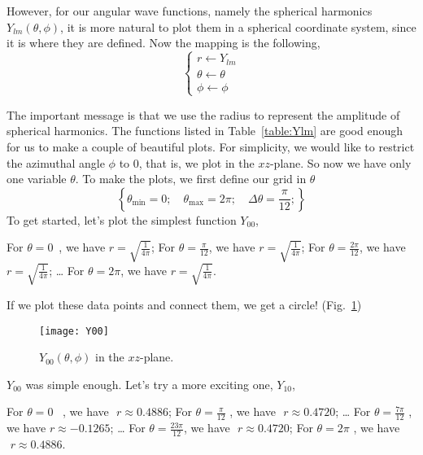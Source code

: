 However, for our angular wave functions, namely the spherical harmonics $Y_{lm}(\theta,\phi)$, it is
more natural to plot them in a spherical coordinate system, since it is where they are
defined. Now the mapping is the following,
\begin{equation} \label{eq:spherical}
  \begin{cases}
  r \gets Y_{lm} \\
  \theta \gets \theta \\
  \phi \gets \phi
  \end{cases}
\end{equation}

The important message is that we use the radius to represent the
amplitude of spherical harmonics. The functions listed in
Table~\ref{table:Ylm} are good enough for us to make a couple of
beautiful plots. For simplicity, we would like
to restrict the azimuthal angle $\phi$ to 0,
that is, we plot in the $xz$-plane. So now we have only one variable $\theta$.
To make the plots, we first define our grid in $\theta$
\begin{equation} \label{eq:thetaGrid}
\left\{ \theta_{\text{min}} = 0;\quad \theta_{\text{max}} = 2\pi;\quad \Delta \theta = \frac{\pi}{12}; \right\}
\end{equation}
To get started, let's plot the simplest function $Y_{00}$,

For $\theta=0\,\,\,$, we have $r=\sqrt{\frac{1}{4\pi}}$;\newline
For $\theta=\frac{\pi}{12}$, we have $r=\sqrt{\frac{1}{4\pi}}$;\newline
For $\theta=\frac{2\pi}{12}$, we have $r=\sqrt{\frac{1}{4\pi}}$;\newline
\ldots \newline
For $\theta=2\pi$, we have $r=\sqrt{\frac{1}{4\pi}}$.

If we plot these data points and connect them, we get a circle! (Fig.~\ref{fig:Y00})
\begin{figure}[h!]
\centering
  \texttt{[image: Y00]}
  \caption{$Y_{00}(\theta,\phi)$ in the $xz$-plane.}
  \label{fig:Y00}
\end{figure}

$Y_{00}$ was simple enough. Let's try a more exciting one, $Y_{10}$,

For $\theta=0\,\,\,\,\,$, we have $\,\,r \approx 0.4886$;\newline
For $\theta=\frac{\pi}{12}\,\,$, we have $\,\,r \approx 0.4720$;\newline
\ldots \newline
For $\theta=\frac{7\pi}{12}\,\,$, we have $\boxed{r \approx -0.1265}$;\newline
\ldots \newline
For $\theta=\frac{23\pi}{12}$, we have $\,\,r \approx 0.4720$;\newline
For $\theta=2\pi\,\,$, we have $\,\,r \approx 0.4886$.

